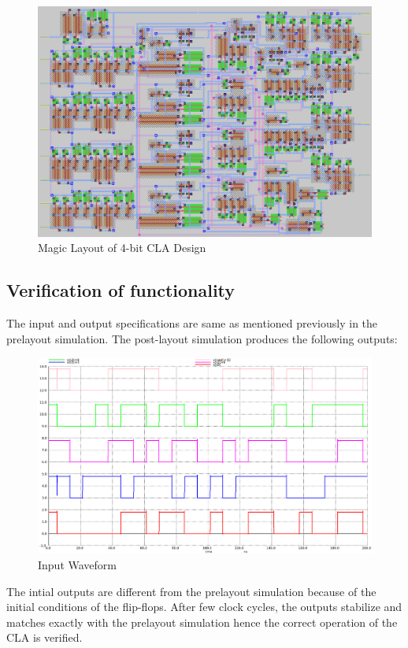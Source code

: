 \documentclass[conference]{IEEEtran}
\begin{document}
\begin{figure}[h]
    \centering
    \includegraphics[width=1\linewidth]{clapostmag.png}
    \caption{Magic Layout of 4-bit CLA Design}
    \label{fig:layout}
\end{figure}

\subsection{Verification of functionality}
The input and output specifications are same as mentioned previously in the prelayout simulation. 
The post-layout simulation produces the following outputs:

\begin{figure}[H]
    \centering
    \includegraphics[width=1\linewidth]{clapostngspi2.png}
    \caption{Input Waveform}
    \label{fig:cla_waveform}
\end{figure}

The intial outputs are different from the prelayout simulation because of the initial conditions of the flip-flops. After few clock cycles, the outputs stabilize and matches exactly with the prelayout simulation hence the correct operation of the CLA is verified.
\end{document}
